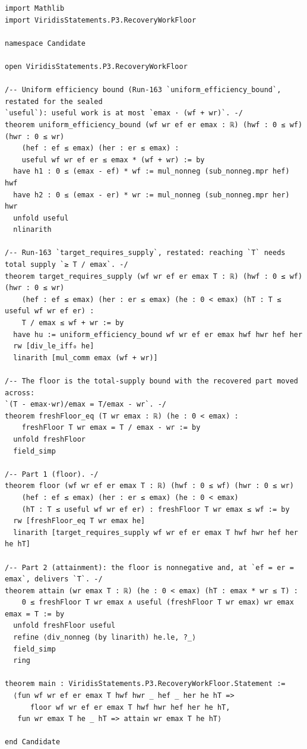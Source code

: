 \documentclass[11pt]{article}
\theoremstyle{definition}
\theoremstyle{remark}
\begin{document}
\begin{lstlisting}[caption={The complete candidate proof \texttt{proofs/P3.RecoveryWorkFloor.lean}.}]
import Mathlib
import ViridisStatements.P3.RecoveryWorkFloor

namespace Candidate

open ViridisStatements.P3.RecoveryWorkFloor

/-- Uniform efficiency bound (Run-163 `uniform_efficiency_bound`, restated for the sealed
`useful`): useful work is at most `emax · (wf + wr)`. -/
theorem uniform_efficiency_bound (wf wr ef er emax : ℝ) (hwf : 0 ≤ wf) (hwr : 0 ≤ wr)
    (hef : ef ≤ emax) (her : er ≤ emax) :
    useful wf wr ef er ≤ emax * (wf + wr) := by
  have h1 : 0 ≤ (emax - ef) * wf := mul_nonneg (sub_nonneg.mpr hef) hwf
  have h2 : 0 ≤ (emax - er) * wr := mul_nonneg (sub_nonneg.mpr her) hwr
  unfold useful
  nlinarith

/-- Run-163 `target_requires_supply`, restated: reaching `T` needs total supply `≥ T / emax`. -/
theorem target_requires_supply (wf wr ef er emax T : ℝ) (hwf : 0 ≤ wf) (hwr : 0 ≤ wr)
    (hef : ef ≤ emax) (her : er ≤ emax) (he : 0 < emax) (hT : T ≤ useful wf wr ef er) :
    T / emax ≤ wf + wr := by
  have hu := uniform_efficiency_bound wf wr ef er emax hwf hwr hef her
  rw [div_le_iff₀ he]
  linarith [mul_comm emax (wf + wr)]

/-- The floor is the total-supply bound with the recovered part moved across:
`(T - emax·wr)/emax = T/emax - wr`. -/
theorem freshFloor_eq (T wr emax : ℝ) (he : 0 < emax) :
    freshFloor T wr emax = T / emax - wr := by
  unfold freshFloor
  field_simp

/-- Part 1 (floor). -/
theorem floor (wf wr ef er emax T : ℝ) (hwf : 0 ≤ wf) (hwr : 0 ≤ wr)
    (hef : ef ≤ emax) (her : er ≤ emax) (he : 0 < emax)
    (hT : T ≤ useful wf wr ef er) : freshFloor T wr emax ≤ wf := by
  rw [freshFloor_eq T wr emax he]
  linarith [target_requires_supply wf wr ef er emax T hwf hwr hef her he hT]

/-- Part 2 (attainment): the floor is nonnegative and, at `ef = er = emax`, delivers `T`. -/
theorem attain (wr emax T : ℝ) (he : 0 < emax) (hT : emax * wr ≤ T) :
    0 ≤ freshFloor T wr emax ∧ useful (freshFloor T wr emax) wr emax emax = T := by
  unfold freshFloor useful
  refine ⟨div_nonneg (by linarith) he.le, ?_⟩
  field_simp
  ring

theorem main : ViridisStatements.P3.RecoveryWorkFloor.Statement :=
  ⟨fun wf wr ef er emax T hwf hwr _ hef _ her he hT =>
      floor wf wr ef er emax T hwf hwr hef her he hT,
   fun wr emax T he _ hT => attain wr emax T he hT⟩

end Candidate
\end{lstlisting}
\end{document}
